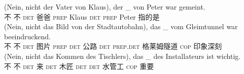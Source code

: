 \eal
\label{ex-nounless-np-relational-noun}
\ex 
\gll (Nein, nicht der Vater von Klaus), der \_ von Peter war gemeint.\\
	\spacebr{}不 不  \textsc{det} 爸爸 \textsc{prep} Klaus \textsc{det} {} \textsc{prep} Peter \passivepst{} 指的是\\
\ex 
\gll (Nein, nicht das Bild von der Stadtautobahn), das \_ vom Gleimtunnel war beeindruckend.\\
	 \spacebr{}不 不  \textsc{det} 图片 \textsc{prep} \textsc{det} 公路 \textsc{det} {} \textsc{prep}.\textsc{det} 格莱姆隧道 \textsc{cop} 印象深刻\\
\ex 
\gll (Nein, nicht das Kommen des Tischlers), das \_ des Installateurs ist wichtig.\\
	 \spacebr{}不 不  \textsc{det} 来 \textsc{det} 木匠 \textsc{det} {} \textsc{det} 水管工 \textsc{cop} 重要\\
\zl
%
%
